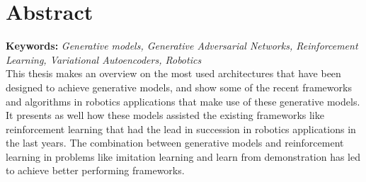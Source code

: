 \pagestyle{fancy}

\providecommand{\keywords}[1]{\textbf{Keywords:} #1}

\chapter*{Abstract}

\vspace{-30 pt}



\keywords{\textit{Generative models, Generative Adversarial Networks, Reinforcement Learning, Variational Autoencoders, Robotics}}\\

This thesis makes an overview on the most used architectures that have been designed to achieve generative models, and show some of the recent frameworks and algorithms in robotics applications that make use of these generative models. It presents as well how these models assisted the existing frameworks like reinforcement learning that had the lead in succession in robotics applications in the last years. The combination between generative models and reinforcement learning in problems like imitation learning and learn from demonstration has led to achieve better performing frameworks. 

\clearpage{\pagestyle{empty}\cleardoublepage}





